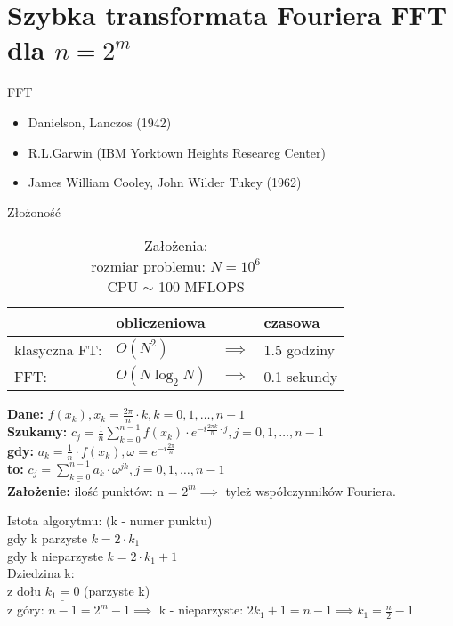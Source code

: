 \section{Szybka transformata Fouriera FFT dla $n=2^m$}
\begin{frame}[allowframebreaks]{FFT}
	\begin{itemize}
		\item Danielson, Lanczos (1942)
		\item R.L.Garwin (IBM Yorktown Heights Researcg Center)
		\item James William Cooley, John Wilder Tukey (1962)
	\end{itemize}
	\begin{table}
		\centering
		\caption{Złożoność}
		\begin{tabular}{l|lll}
			& obliczeniowa && czasowa \\
			\hline
			klasyczna FT: & $O(N^2)$ & $\implies$ & 1.5 godziny \\
			FFT: & $O(N\log_2N)$ & $\implies$ & 0.1 sekundy 
		\end{tabular}
		\caption*{Założenia: \\
			rozmiar problemu: $N = 10^6$ \\
			CPU $\sim$ 100 MFLOPS}
	\end{table}
	\textbf{Dane:} $f(x_k), x_k = \frac{2\pi}{n} \cdot k, k = 0, 1, \dots, n-1$ \\
	\textbf{Szukamy:} $c_j = \frac{1}{n} \sum\limits_{k = 0}^{n-1} f(x_k) \cdot e^{-i\frac{2\pi k}{n} \cdot j}, j = 0, 1, \dots, n-1$ \\
	\textbf{gdy:} $a_k = \frac{1}{n} \cdot f(x_k), \omega = e^{-i\frac{2\pi}{n}}$ \\
	\textbf{to:} $\underline{c_j = \sum\limits_{k = 0}^{n-1} a_k \cdot \omega^{jk}}, j = 0, 1, \dots, n-1$ \\
	\textbf{Założenie:} ilość punktów: n = $2^m \implies$ tyleż współczynników Fouriera. \\
	\begin{block}{Istota algorytmu:}
	(k - numer punktu) \\
	gdy k parzyste $k = 2 \cdot k_1$ \\
	gdy k nieparzyste $k = 2 \cdot k_1 + 1$ \\
	Dziedzina k: \\
	z dołu $\underline{k_1 = 0}$ (parzyste k)  \\
	z góry: $n-1 = 2^m - 1 \implies$ k - nieparzyste: $2k_1 + 1 = n-1 \implies k_1 = \frac{n}{2} - 1$ \\

\end{block}
\end{frame}
